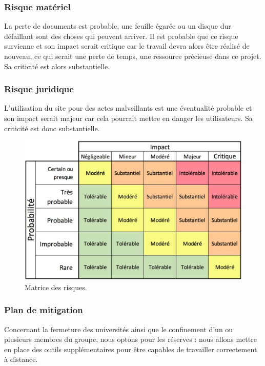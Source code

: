 \documentclass[a4paper,11pt]{article}
\begin{document}
\subsubsection{Risque matériel}

La perte de documents est probable, une feuille égarée ou un disque dur défaillant sont des choses
qui peuvent arriver. Il est probable que ce risque survienne et son impact serait critique car le travail
devra alors être réalisé de nouveau, ce qui serait une perte de temps, une ressource précieuse dans
ce projet. Sa criticité est alors substantielle.\\

\subsubsection{Risque juridique}

L’utilisation du site pour des actes malveillants est une éventualité probable et son impact serait
majeur car cela pourrait mettre en danger les utilisateurs. Sa criticité est donc substantielle.\\

\begin{figure}[H]
  \includegraphics[width=\linewidth]{images/matrice-criticite.png}
  \caption{Matrice des risques.}
  \label{fig:matrice-risques}
\end{figure}

\subsubsection{Plan de mitigation}

Concernant la fermeture des universités ainsi que le confinement d’un ou plusieurs membres du
groupe, nous optons pour les réserves : nous allons mettre en place des outils supplémentaires pour
être capables de travailler correctement à distance.\\
\end{document}
